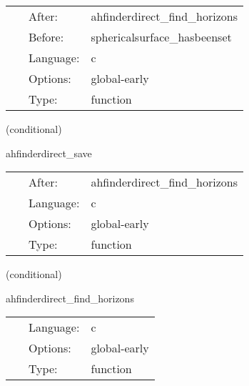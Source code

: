 \hspace{5mm}

 \begin{tabular*}{160mm}{cll} 
~ & After:  & ahfinderdirect\_find\_horizons \\ 
~ & Before:  & sphericalsurface\_hasbeenset \\ 
~ & Language:  & c \\ 
~ & Options:  & global-early \\ 
~ & Type:  & function \\ 
\end{tabular*} 


\vspace{5mm}

   (conditional) 

\hspace{5mm} ahfinderdirect\_save 

\hspace{5mm}{\it save apparent horizon(s) into cactus variables } 


\hspace{5mm}

 \begin{tabular*}{160mm}{cll} 
~ & After:  & ahfinderdirect\_find\_horizons \\ 
~ & Language:  & c \\ 
~ & Options:  & global-early \\ 
~ & Type:  & function \\ 
\end{tabular*} 


\vspace{5mm}

   (conditional) 

\hspace{5mm} ahfinderdirect\_find\_horizons 

\hspace{5mm}{\it find apparent horizon(s) after this time step } 


\hspace{5mm}

 \begin{tabular*}{160mm}{cll} 
~ & Language:  & c \\ 
~ & Options:  & global-early \\ 
~ & Type:  & function \\ 
\end{tabular*} 


\vspace{5mm}

